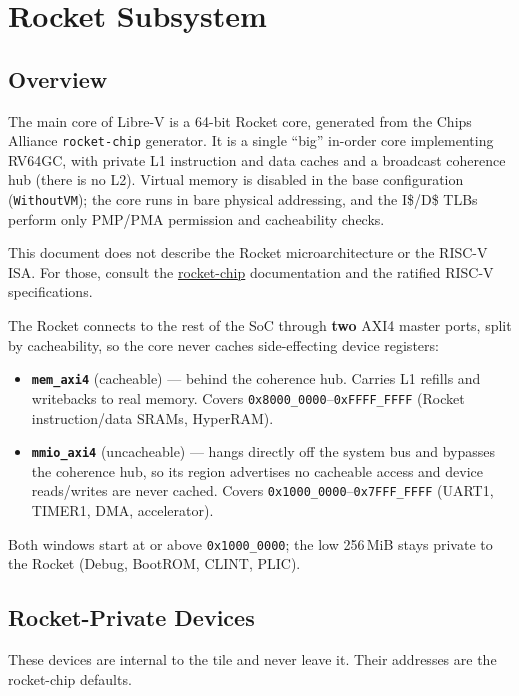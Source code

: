 \chapter{Rocket Subsystem}\label{ch:sw-rocket-sys}

\section{Overview}
The main core of Libre-V is a 64-bit Rocket core, generated from the Chips Alliance
\texttt{rocket-chip} generator. It is a single ``big'' in-order core implementing RV64GC, with private
L1 instruction and data caches and a broadcast coherence hub (there is no L2). Virtual memory is
disabled in the base configuration (\texttt{WithoutVM}); the core runs in bare physical addressing, and
the I\$/D\$ TLBs perform only PMP/PMA permission and cacheability checks.

\begin{docwarning}
This document does not describe the Rocket microarchitecture or the RISC-V ISA. For those, consult the
\href{https://github.com/chipsalliance/rocket-chip}{rocket-chip} documentation and the ratified RISC-V
specifications.
\end{docwarning}

The Rocket connects to the rest of the SoC through \textbf{two} AXI4 master ports, split by
cacheability, so the core never caches side-effecting device registers:
\begin{itemize}[nosep]
  \item \textbf{\texttt{mem\_axi4}} (cacheable) --- behind the coherence hub. Carries L1 refills and
        writebacks to real memory. Covers \texttt{0x8000\_0000}--\texttt{0xFFFF\_FFFF}
        (Rocket instruction/data SRAMs, HyperRAM).
  \item \textbf{\texttt{mmio\_axi4}} (uncacheable) --- hangs directly off the system bus and bypasses
        the coherence hub, so its region advertises no cacheable access and device reads/writes are
        never cached. Covers \texttt{0x1000\_0000}--\texttt{0x7FFF\_FFFF} (UART1, TIMER1, DMA,
        accelerator).
\end{itemize}
Both windows start at or above \texttt{0x1000\_0000}; the low 256\,MiB stays private to the Rocket
(Debug, BootROM, CLINT, PLIC).

\section{Rocket-Private Devices}
These devices are internal to the tile and never leave it. Their addresses are the rocket-chip defaults.

